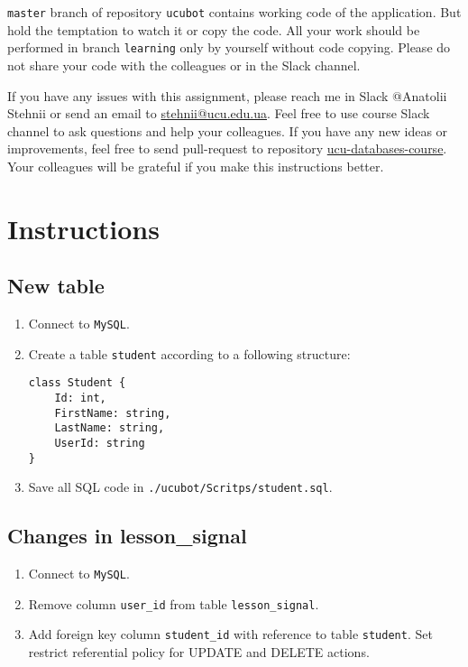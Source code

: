 \documentclass[12pt]{article}
\newcommand{\code}[1]{\texttt{#1}}
\begin{document}
\code{master} branch of repository \code{ucubot} contains working code of the application. But hold the temptation to watch it or copy the code. All your work should be performed in branch \code{learning} only by yourself without code copying. Please do not share your code with the colleagues or in the Slack channel.

If you have any issues with this assignment, please reach me in Slack @Anatolii Stehnii or send an email to \href{mailto:stehnii@ucu.edu.ua}{stehnii@ucu.edu.ua}. Feel free to use course Slack channel to ask questions and help your colleagues. If you have any new ideas or improvements, feel free to send pull-request to repository \href{https://github.com/tsdaemon/ucu-databases-course}{ucu-databases-course}. Your colleagues will be grateful if you make this instructions better.

\section*{Instructions}

\subsection*{New table}

\begin{enumerate}
\item Connect to \code{MySQL}.
\item Create a table \code{student} according to a following structure:
\begin{verbatim}
class Student {
    Id: int,
    FirstName: string,
    LastName: string,
    UserId: string
}
\end{verbatim}
\item Save all SQL code in \break \code{./ucubot/Scritps/student.sql}.
\end{enumerate}

\subsection*{Changes in lesson\_signal}

\begin{enumerate}

\item Connect to \code{MySQL}.
\item Remove column \code{user\_id} from table \code{lesson\_signal}.
\item Add foreign key column \code{student\_id} with reference to table \code{student}. Set restrict referential policy for UPDATE and DELETE actions.

\end{enumerate}
\end{document}
